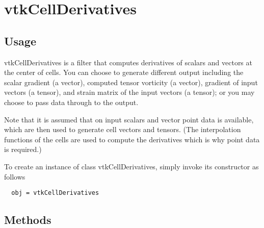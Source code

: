 \section{vtkCellDerivatives}

\subsection{Usage}

 vtkCellDerivatives is a filter that computes derivatives of scalars
 and vectors at the center of cells. You can choose to generate
 different output including the scalar gradient (a vector), computed
 tensor vorticity (a vector), gradient of input vectors (a tensor),
 and strain matrix of the input vectors (a tensor); or you may
 choose to pass data through to the output.

 Note that it is assumed that on input scalars and vector point data
 is available, which are then used to generate cell vectors and tensors.
 (The interpolation functions of the cells are used to compute the
 derivatives which is why point data is required.)

To create an instance of class vtkCellDerivatives, simply
invoke its constructor as follows
\begin{verbatim}
  obj = vtkCellDerivatives
\end{verbatim}
\subsection{Methods}

